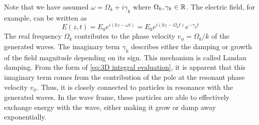 Note that we have assumed $\omega=\Omega_k+i\gamma_k$ where
$\Omega_k,\gamma_k\in\mathbb{R}$. The electric field, for example, can be written as
\begin{equation}
    E(z,t)=E_0e^{i(kz-\omega t)}=E_0e^{i(kz-\Omega_kt)}e^{-\gamma_kt}
\end{equation}
The real frequency $\Omega_k$ contributes to the phase velocity
$v_\phi=\Omega_k/k$ of the generated waves. The imaginary term $\gamma_k$
describes either the damping or growth of the field magnitude depending on its
sign. This mechanism is called Landau damping. From the form of \cref{eq:3D
integral evaluation}, it is apparent that this imaginary term comes from the
contribution of the pole at the resonant phase velocity $v_\phi$. Thus, it is
closely connected to particles in resonance with the generated waves. In the
wave frame, these particles are able to effectively exchange energy with
the wave, either making it grow or damp away exponentially.

